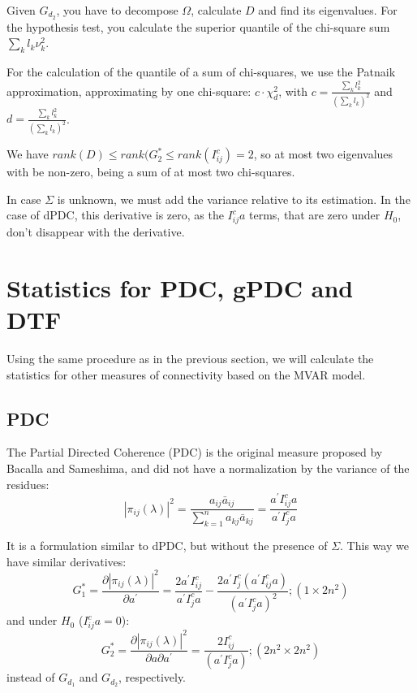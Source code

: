 \documentclass[a4paper,10pt]{article}
\begin{document}
Given $G_{d_2}$, you have to decompose $\Omega$, calculate $D$ and find its eigenvalues. For the hypothesis test, you calculate the superior quantile of the chi-square sum $\sum_{k} {l_{k} \nu_{k}^{2}}$. 

For the calculation of the quantile of a sum of chi-squares, we use the Patnaik approximation, approximating by one chi-square: $c\cdot \chi^2_d$, with $c = \frac{\sum_k {l_k^2}}{(\sum_k {l_k})^2}$ and $d = \frac{\sum_k {l_k^2}}{(\sum_k {l_k})^2}$.

We have $rank(D) \le rank(G_{2}^{\ast} \le rank(I_{ij}^{c}) = 2$, so at most two eigenvalues with be non-zero, being a sum of at most two chi-squares.

In case $\Sigma$ is unknown, we must add the variance relative to its estimation. In the case of dPDC, this derivative is zero, as the $I_{ij}^{c} a$ terms, that are zero under $H_0$, don't disappear with the derivative.

\section{Statistics for PDC, gPDC and DTF}

Using the same procedure as in the previous section, we will calculate the statistics for other measures of connectivity based on the MVAR model.

\subsection{PDC}

The Partial Directed Coherence (PDC) is the original measure proposed by Bacalla and Sameshima, and did not have a normalization by the variance of the residues:
\begin{equation}
|\pi_{ij}(\lambda)|^{2} = \frac{a_{ij} \bar{a}_{ij}}{\sum_{k=1}^{n}{a_{kj} \bar{a}_{kj}}} = \frac{a^{'} I_{ij}^{c} a}{a^{'} I_{j}^{c} a}
\end{equation}

It is a formulation similar to dPDC, but without the presence of $\Sigma$. This way we have similar derivatives:
\begin{equation}
G_{1}^{\ast} = \frac{\partial |\pi_{ij}(\lambda)|^{2}}{\partial a^{'}} = \frac{2 a^{'} I_{ij}^{c}} {a^{'} I_{j}^{c} a} - \frac{2 a^{'} I_{j}^{c} (a^{'} I_{ij}^{c} a)} {(a^{'} I_{j}^{c} a)^{2}}; (1 \times 2n^{2})
\end{equation}
and under $H_0$ ($I_{ij}^{c} a = 0$):
\begin{equation}
G_{2}^{\ast} = \frac{\partial |\pi_{ij}(\lambda)|^{2}}{\partial a \partial a^{'}} = \frac{2 I_{ij}^{c}}{(a^{'} I_{j}^{c} a)}; (2n^{2} \times 2n^{2})
\end{equation}
instead of $G_{d_1}$ and $G_{d_2}$, respectively.
\end{document}
